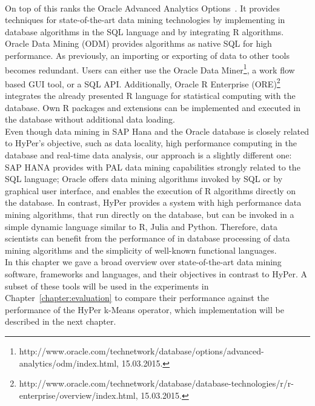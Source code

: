 \\
On top of this ranks the Oracle Advanced Analytics Options~\parencite{oracle}. It provides techniques for state-of-the-art data mining technologies by implementing in database algorithms in the SQL language and by integrating R algorithms. Oracle Data Mining (ODM) provides algorithms as native SQL for high performance. As previously, an importing or exporting of data to other tools becomes redundant. Users can either use the Oracle Data Miner\footnote{http://www.oracle.com/technetwork/database/options/advanced-analytics/odm/index.html, 15.03.2015.}, a work flow based GUI tool, or a SQL API. Additionally, Oracle R Enterprise (ORE)\footnote{http://www.oracle.com/technetwork/database/database-technologies/r/r-enterprise/overview/index.html, 15.03.2015.} integrates the already presented R language for statistical computing with the database. Own R packages and extensions can be implemented and executed in the database without additional data loading.
\\
Even though data mining in SAP Hana and the Oracle database is closely related to HyPer's objective, such as data locality, high performance computing in the database and real-time data analysis, our approach is a slightly different one: SAP HANA provides with PAL data mining capabilities strongly related to the SQL language; Oracle offers data mining algorithms invoked by SQL or by graphical user interface, and enables the execution of R algorithms directly on the database. In contrast, HyPer provides a system with high performance data mining algorithms, that run directly on the database, but can be invoked in a simple dynamic language similar to R, Julia and Python. Therefore, data scientists can benefit from the performance of in database processing of data mining algorithms and the simplicity of well-known functional languages.
\\
In this chapter we gave a broad overview over state-of-the-art data mining software, frameworks and languages, and their objectives in contrast to HyPer. A subset of these tools will be used in the experiments in Chapter~\ref{chapter:evaluation} to compare their performance against the performance of the HyPer k-Means operator, which implementation will be described in the next chapter.

